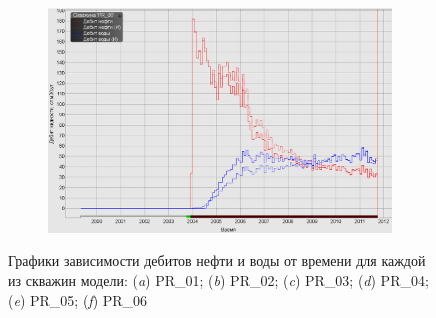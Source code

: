 \documentclass[a4paper,12pt]{article}
\begin{document}
\begin{figure}[H]
\begin{subfigure}[t]{\dimexpr.5\linewidth-1.3em\relax}
	\end{subfigure}
\hfill %
	\begin{subfigure}[t]{\dimexpr.5\linewidth-1.3em\relax}
		\centering
		\includegraphics[width=.95\linewidth]{aw6}
	\end{subfigure}
\captionsetup{justification=centering} %
\caption{Графики зависимости дебитов нефти и воды от времени для каждой из скважин модели: ({\itshape a}) PR\_01; ({\itshape b}) PR\_02; ({\itshape c}) PR\_03; ({\itshape d}) PR\_04; ({\itshape e}) PR\_05; ({\itshape f}) PR\_06} 
\label{fig:adapted_wells_1}
\end{figure}
\end{document}
